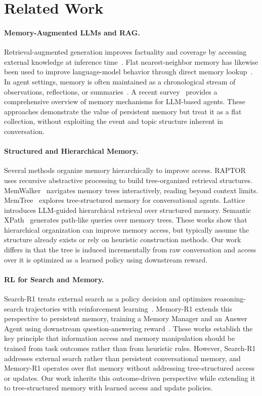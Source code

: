 \section{Related Work}
\paragraph{Memory-Augmented LLMs and RAG.}
Retrieval-augmented generation improves factuality and coverage by accessing external knowledge at inference time~. Flat nearest-neighbor memory has likewise been used to improve language-model behavior through direct memory lookup~. In agent settings, memory is often maintained as a chronological stream of observations, reflections, or summaries~. A recent survey~ provides a comprehensive overview of memory mechanisms for LLM-based agents. These approaches demonstrate the value of persistent memory but treat it as a flat collection, without exploiting the event and topic structure inherent in conversation.

\paragraph{Structured and Hierarchical Memory.}
Several methods organize memory hierarchically to improve access. RAPTOR~ uses recursive abstractive processing to build tree-organized retrieval structures. MemWalker~ navigates memory trees interactively, reading beyond context limits. MemTree~ explores tree-structured memory for conversational agents. Lattice~ introduces LLM-guided hierarchical retrieval over structured memory. Semantic XPath~ generates path-like queries over memory trees. These works show that hierarchical organization can improve memory access, but typically assume the structure already exists or rely on heuristic construction methods. Our work differs in that the tree is induced incrementally from raw conversation and access over it is optimized as a learned policy using downstream reward.

\paragraph{RL for Search and Memory.}
Search-R1 treats external search as a policy decision and optimizes reasoning-search trajectories with reinforcement learning~. Memory-R1 extends this perspective to persistent memory, training a Memory Manager and an Answer Agent using downstream question-answering reward~. These works establish the key principle that information access and memory manipulation should be trained from task outcomes rather than from heuristic rules. However, Search-R1 addresses external search rather than persistent conversational memory, and Memory-R1 operates over flat memory without addressing tree-structured access or updates. Our work inherits this outcome-driven perspective while extending it to tree-structured memory with learned access and update policies.

